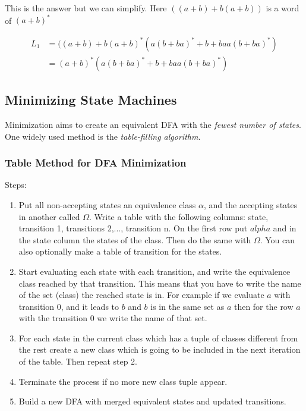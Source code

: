 This is the answer but we can simplify. Here \(((a+ b) + b(a+b))\) is a word of \((a+b)^*\)

\begin{align*}
    L_1 &= ((a+b)  + b(a + b)^*(a(b + ba)^* + b + baa(b + ba)^*) \\
        &= (a+b)^* (a(b + ba)^* + b + baa(b + ba)^*)
\end{align*}

\subsection{Minimizing State Machines}

Minimization aims to create an equivalent DFA with the \emph{fewest number of states}. One widely used 
method is the \emph{table-filling algorithm}.

\subsubsection{Table Method for DFA Minimization}

Steps:

\begin{enumerate}
    
    \item Put all non-accepting states an equivalence class \(\alpha\), and  the accepting states in another 
          called \(\Omega\). Write a table with the following columns: state, 
          transition 1, transitions 2,..., transition n. On the first row put \(alpha\) and in the state column 
          the states of the class. Then do the same with \(\Omega\). You can also optionally make a table 
          of transition for the states.

    \item Start evaluating each state with each transition, and write the equivalence class reached by that transition. 
          This means that you have to write the name of the set (class) the reached state is in. For example if 
          we evaluate \(a\) with transition 0, and it leads to \(b\) and \(b\) is in the same set as \(a\) then for 
          the row \(a\) with the transition 0 we write the name of that set.

    \item  For each state in the current class which has a tuple of classes different from the rest create 
           a new class which is going to be included in the next iteration of the table. Then repeat step 2.

    \item Terminate the process if no more new class tuple appear.

    \item Build a new DFA with merged equivalent states and updated transitions.

\end{enumerate}

